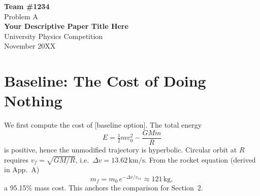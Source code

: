 \documentclass[11pt,a4paper]{article}
\numberwithin{equation}{section} %
\newcommand{\unit}[1]{\,\mathrm{#1}}
\begin{document}
\begin{titlepage}
  \centering
  \vspace*{2cm}
  {\Large \textbf{Team \#1234}}\\[0.4cm]
  {\large Problem A}\\[2.2cm]
  {\LARGE \bfseries Your Descriptive Paper Title Here}\\[3cm]
  \vfill
  University Physics Competition\\
  November 20XX
\end{titlepage}

\begin{abstract}
\noindent
We define the key quantities of the problem ($R \approx 2.5\times10^{4}\unit{km}$,
$v_0 = 30\unit{km/s}$) and identify the central trade-off: if [quantity A] is too
large, [failure mode 1]; if too small, [failure mode 2].
Section~1 establishes a fuel-only baseline costing 95\% of initial mass.
Section~2 develops the model: [governing equation] with [data-anchored fits],
integrated by [method] at [step size], verified by step-halving to
[n] significant figures. The admissible window is
\[
  \boxed{\;8.8296^\circ < \theta < 8.8549^\circ\;}
\]
a margin of only $0.0253^\circ$. We therefore \emph{advise against} the maneuver
and identify [parameter] as the most promising lever to widen the window.
\end{abstract}
\newpage

\section{Baseline: The Cost of Doing Nothing}
We first compute the cost of [baseline option]. The total energy
\begin{equation}
  E = \tfrac12 m v_0^2 - \frac{GMm}{R}
\end{equation}
is positive, hence the unmodified trajectory is hyperbolic. Circular orbit at
$R$ requires $v_f = \sqrt{GM/R}$, i.e.\ $\Delta v = 13.62\unit{km/s}$.
From the rocket equation (derived in App.~A)
\begin{equation}
  m_f = m_0\, e^{-\Delta v / v_{ex}} \approx 121\unit{kg},
  \label{eq:rocket}
\end{equation}
a 95.15\% mass cost. This anchors the comparison for Section~2.
\end{document}
